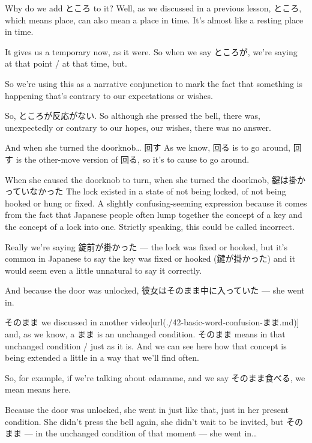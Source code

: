 Why do we add ところ to it? Well, as we discussed in a previous lesson, ところ, which means place, can also mean a place in time. It's almost like a resting place in time.

It gives us a temporary now, as it were. So when we say ところが, we're saying at that point / at that time, but.

So we're using this as a narrative conjunction to mark the fact that something is happening that's contrary to our expectations or wishes.

So, ところが反応がない. So although she pressed the bell, there was, unexpectedly or contrary to our hopes, our wishes, there was no answer.

And when she turned the doorknob\ldots{} 回す As we know, 回る is to go around, 回す is the other-move version of 回る, so it's to cause to go around.

When she caused the doorknob to turn, when she turned the doorknob, 鍵は掛かっていなかった The lock existed in a state of not being locked, of not being hooked or hung or fixed. A slightly confusing-seeming expression because it comes from the fact that Japanese people often lump together the concept of a key and the concept of a lock into one. Strictly speaking, this could be called incorrect.

{}

Really we're saying 錠前が掛かった --- the lock was fixed or hooked, but it's common in Japanese to say the key was fixed or hooked (鍵が掛かった) and it would seem even a little unnatural to say it correctly.

\thinrule

And because the door was unlocked, 彼女はそのまま中に入っていた --- she went in.

{}

そのまま we discussed in another video\goto{{[}42{]}}[url(./42-basic-word-confusion-まま.md)] and, as we know, a まま is an unchanged condition. そのまま means in that unchanged condition / just as it is. And we can see here how that concept is being extended a little in a way that we'll find often.

So, for example, if we're talking about edamame, and we say そのまま食べる, we mean  means here.

Because the door was unlocked, she went in just like that, just in her present condition. She didn't press the bell again, she didn't wait to be invited, but そのまま --- in the unchanged condition of that moment --- she went in\ldots{}

\stopsectionlevel
